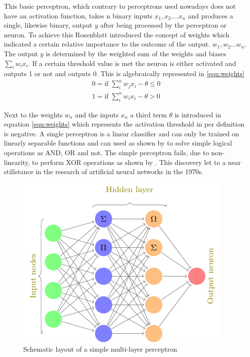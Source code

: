 This basic perceptron, which contrary to perceptrons used nowadays does not have an activation function, takes n binary
inputs $x_1 , x_2 .... x_n$ and produces a single, likewise binary, output $y$ after being processed by the perceptron or neuron.
To achieve this Rosenblatt introduced the concept of weights which indicated a certain relative importance to the outcome of the
output. $w_1 , w_2 ... w_n$. The output $y$ is determined by the weighted sum of the weights and biases $\sum_i w_ix_i $. If a certain
threshold value is met  the neuron is either activated and outputs 1 or not and outputs 0. This is algebraically represented in
\ref{eqn:weights}
\begin{subequations}
  \begin{align}
    0  = \mbox{if } \sum_i^n w_j x_i - \theta \leq 0 \\
    1 =  \mbox{if } \sum_i^n w_i x_i - \theta > 0
  \end{align}
  \label{eqn:weights}
\end{subequations}

Next to the weights $w_n$ and the inputs $x_n$ a third term $\theta$ is introduced in equation \ref{eqn:weights} which represents
the activation threshold in per definition is negative. A single perceptron is a linear classifier and can only be trained on
linearly separable functions and can used as shown by \cite{rosenblatt1961} to solve simple logical operations as AND, OR and not.
The simple perceptron fails, due to non-linearity, to perform XOR operations as shown by \cite{marvin1969}. This discovery let to
a near stillstance in the research of artificial neural networks in the 1970s.



\begin{figure}[H]
\centering
\includegraphics[height=.25\textheight, width=.5\textwidth]{Figures/neuralnet}
\decoRule
\caption[Schematic layout of a simple mulit-layer perceptron]{Schematic layout of a simple multi-layer perceptron}
\label{fig:nn}
\end{figure}



